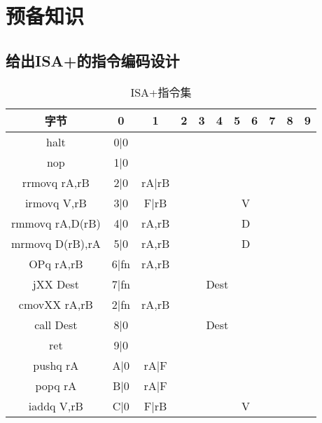 \section{预备知识}

\subsection{给出ISA+的指令编码设计}

\begin{table}[H]
    \centering
    \begin{tabular}{|c|c|c|c|c|c|c|c|c|c|c|}
        \hline 
        字节 & 0 & 1 & 2 & 3 & 4 & 5 & 6 & 7 & 8 & 9 \\ 
        \hline 
        halt & 0|0 & \multicolumn{9}{c|}{} \\ 
        \hline 
        nop & 1|0 & \multicolumn{9}{c|}{} \\ 
        \hline 
        rrmovq rA,rB & 2|0 & rA|rB & \multicolumn{8}{c|}{} \\ 
        \hline 
        irmovq V,rB & 3|0 & F|rB & \multicolumn{8}{c|}{V} \\ 
        \hline 
        rmmovq rA,D(rB) & 4|0 & rA,rB & \multicolumn{8}{c|}{D} \\ 
        \hline 
        mrmovq D(rB),rA & 5|0 & rA,rB & \multicolumn{8}{c|}{D} \\ 
        \hline 
        OPq rA,rB & 6|fn & rA,rB & \multicolumn{8}{c|}{} \\ 
        \hline 
        jXX Dest & 7|fn & \multicolumn{8}{c|}{Dest} &  \\ 
        \hline 
        cmovXX rA,rB & 2|fn & rA,rB & \multicolumn{8}{c|}{} \\ 
        \hline 
        call Dest & 8|0 & \multicolumn{8}{c|}{Dest} &  \\ 
        \hline 
        ret & 9|0 & \multicolumn{9}{c|}{}  \\ 
        \hline 
        pushq rA & A|0 & rA|F & \multicolumn{8}{c|}{} \\ 
        \hline 
        popq rA & B|0 & rA|F & \multicolumn{8}{c|}{} \\ 
        \hline 
        iaddq V,rB & C|0 & F|rB & \multicolumn{8}{c|}{V} \\ 
        \hline 
    \end{tabular} 
    \caption{ISA+指令集}
\end{table}


